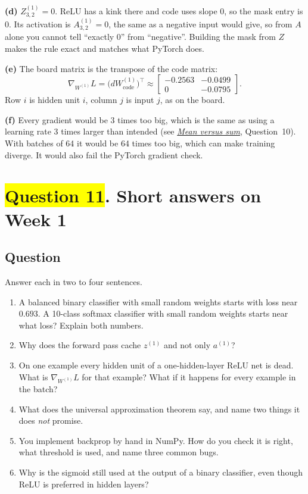 \documentclass[12pt,a4paper]{article}
\newcommand{\seeconcept}[3]{(see \hyperref[#1]{\textit{#2}}, Question~#3)}
\newcommand{\hlq}[1]{{\setlength{\fboxsep}{1.5pt}\colorbox{yellow}{#1}}}
\begin{document}
\textbf{(d)} $Z^{(1)}_{3,2}=0$. ReLU has a kink there and code uses slope 0, so the mask entry is 0. Its activation is $A^{(1)}_{3,2}=0$, the same as a negative input would give, so from $A$ alone you cannot tell ``exactly 0'' from ``negative''. Building the mask from $Z$ makes the rule exact and matches what PyTorch does.

\textbf{(e)} The board matrix is the transpose of the code matrix:
\[
\nabla_{W^{(1)}}L=\bigl(dW^{(1)}_{\text{code}}\bigr)^\top\approx\begin{bmatrix}-0.2563&-0.0499\\0&-0.0795\end{bmatrix}.
\]
Row $i$ is hidden unit $i$, column $j$ is input $j$, as on the board.

\textbf{(f)} Every gradient would be 3 times too big, which is the same as using a learning rate 3 times larger than intended \seeconcept{c:meansum}{Mean versus sum}{10}. With batches of 64 it would be 64 times too big, which can make training diverge. It would also fail the PyTorch gradient check.

\section[Question 11. Short answers on Week 1]{\hlq{Question 11}. Short answers on Week 1}
\subsection*{Question}
Answer each in two to four sentences.
\begin{enumerate}[label=(\alph*)]
\item[\hlq{(a)}] A balanced binary classifier with small random weights starts with loss near $0.693$. A 10-class softmax classifier with small random weights starts near what loss? Explain both numbers.
\item[(b)] Why does the forward pass cache $z^{(1)}$ and not only $a^{(1)}$?
\item[\hlq{(c)}] On one example every hidden unit of a one-hidden-layer ReLU net is dead. What is $\nabla_{W^{(1)}}L$ for that example? What if it happens for every example in the batch?
\item[\hlq{(d)}] What does the universal approximation theorem say, and name two things it does \emph{not} promise.
\item[\hlq{(e)}] You implement backprop by hand in NumPy. How do you check it is right, what threshold is used, and name three common bugs.
\item[(f)] Why is the sigmoid still used at the output of a binary classifier, even though ReLU is preferred in hidden layers?
\end{enumerate}
\end{document}
